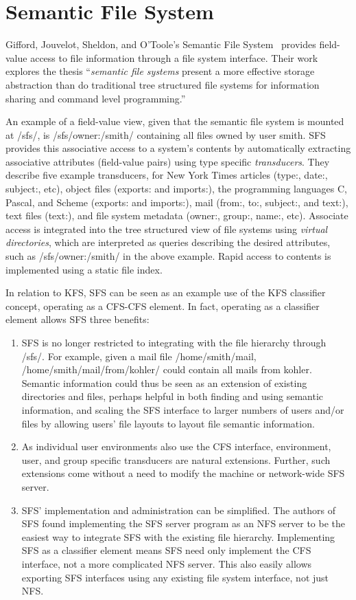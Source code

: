\section{Semantic File System}
\label{sec:sfs}

Gifford, Jouvelot, Sheldon, and O'Toole's Semantic File
System~\cite{jouvelot91semantic} provides field-value access to file
information through a file system interface. Their work explores the
thesis ``\textit{semantic file systems} present a more effective
storage abstraction than do traditional tree structured file systems
for information sharing and command level programming.''

An example of a field-value view, given that the semantic file system
is mounted at /sfs/, is /sfs/owner:/smith/ containing all files owned
by user smith. SFS provides this associative access to a system's
contents by automatically extracting associative attributes
(field-value pairs) using type specific \textit{transducers}. They
describe five example transducers, for New York Times articles (type:,
date:, subject:, etc), object files (exports: and imports:), the
programming languages C, Pascal, and Scheme (exports: and imports:),
mail (from:, to:, subject:, and text:), text files (text:), and file
system metadata (owner:, group:, name:, etc). Associate access is
integrated into the tree structured view of file systems using
\textit{virtual directories}, which are interpreted as queries
describing the desired attributes, such as /sfs/owner:/smith/ in the
above example. Rapid access to contents is implemented using a static
file index.

In relation to KFS, SFS can be seen as an example use of the KFS
classifier concept, operating as a CFS-CFS element. In fact, operating
as a classifier element allows SFS three benefits:
\begin{enumerate}
\item SFS is no longer restricted to integrating with the file
  hierarchy through /sfs/. For example, given a mail file
  /home/smith/mail, /home/\-smith/\-mail/\-from/\-kohler/ could
  contain all mails from kohler. Semantic information could thus be
  seen as an extension of existing directories and files, perhaps
  helpful in both finding and using semantic information, and scaling
  the SFS interface to larger numbers of users and/or files by
  allowing users' file layouts to layout file semantic information.
\item As individual user environments also use the CFS interface,
  environment, user, and group specific transducers are natural
  extensions. Further, such extensions come without a need to modify
  the machine or network-wide SFS server.
\item SFS' implementation and administration can be simplified. The
  authors of SFS found implementing the SFS server program as an NFS
  server to be the easiest way to integrate SFS with the existing file
  hierarchy. Implementing SFS as a classifier element means SFS need
  only implement the CFS interface, not a more complicated NFS server.
  This also easily allows exporting SFS interfaces using any existing
  file system interface, not just NFS.
\end{enumerate}
